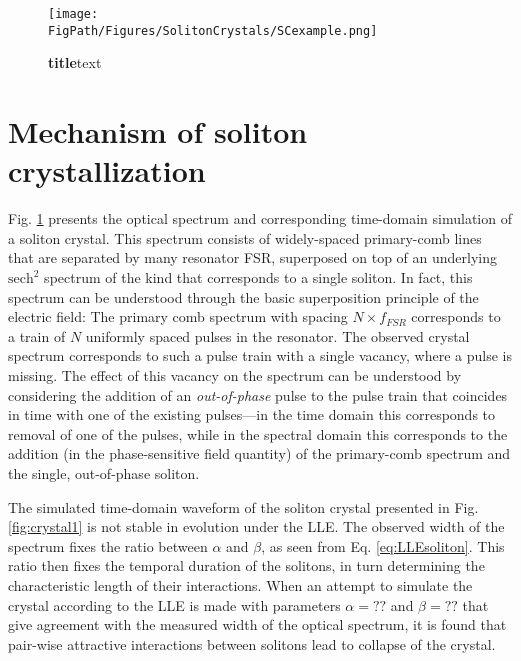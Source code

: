 \begin{figure}[htpb]
	\begin{center}
		\texttt{[image: \\FigPath/Figures/SolitonCrystals/SCexample.png]}
	\end{center}
	\caption[Figure Title]{\textbf{title}text}
	\label{fig:SCexample}
\end{figure} 

\section{Mechanism of soliton crystallization}

Fig. \ref{fig:SCexample} presents the optical spectrum and corresponding time-domain simulation of a soliton crystal. This spectrum consists of widely-spaced primary-comb lines that are separated by many resonator FSR, superposed on top of an underlying $\mathrm{sech}^2$ spectrum of the kind that corresponds to a single soliton. In fact, this spectrum can be understood through the basic superposition principle of the electric field: The primary comb spectrum with spacing $N\times f_{FSR}$ corresponds to a train of $N$ uniformly spaced pulses in the resonator. The observed crystal spectrum corresponds to such a pulse train with a single vacancy, where a pulse is missing. The effect of this vacancy on the spectrum can be understood by considering the addition of an \textit{out-of-phase} pulse to the pulse train that coincides in time with one of the existing pulses---in the time domain this corresponds to removal of one of the pulses, while in the spectral domain this corresponds to the addition (in the phase-sensitive field quantity) of the primary-comb spectrum and the single, out-of-phase soliton. 

The simulated time-domain waveform of the soliton crystal presented in Fig. \ref{fig:crystal1} is not stable in evolution under the LLE. The observed width of the spectrum fixes the ratio between $\alpha$ and $\beta$, as seen from Eq. \ref{eq:LLEsoliton}. This ratio then fixes the temporal duration of the solitons, in turn determining the characteristic length of their interactions. When an attempt to simulate the crystal according to the LLE is made with parameters $\alpha=??$ and $\beta=??$ that give agreement with the measured width of the optical spectrum, it is found that pair-wise attractive interactions between solitons lead to collapse of the crystal.

